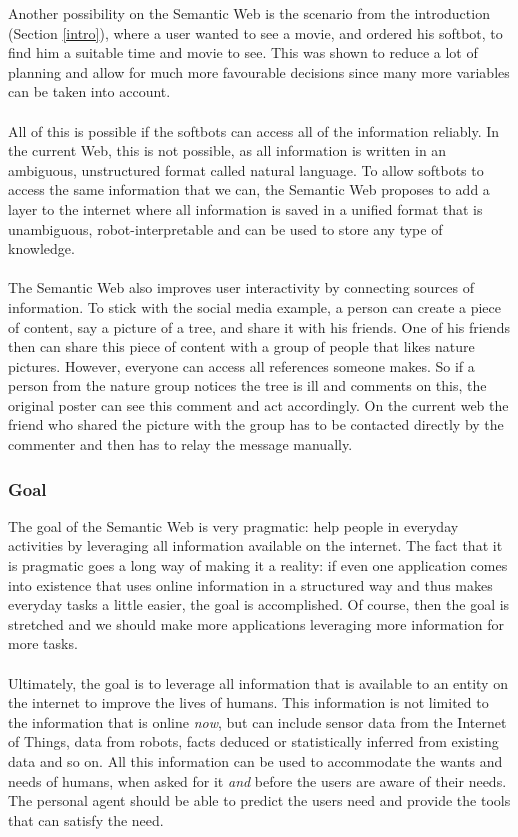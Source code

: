 \documentclass{article}
\begin{document}
 Another possibility on the Semantic Web is the scenario from the introduction (Section \ref{intro}), where a user wanted to see a movie, and ordered his softbot, to find him a suitable time and movie to see. This was shown to reduce a lot of planning and allow for much more favourable decisions since many more variables can be taken into account.
 \paragraph{}
 All of this is possible if the softbots can access all of the information reliably. In the current Web, this is not possible, as all information is written in an ambiguous, unstructured format called natural language. To allow softbots to access the same information that we can, the Semantic Web proposes to add a layer to the internet where all information is saved in a unified format that is unambiguous, robot-interpretable and can be used to store any type of knowledge.
 \paragraph{}
  The Semantic Web also improves user interactivity by connecting sources of information. To stick with the social media example, a person can create a piece of content, say a picture of a tree, and share it with his friends. One of his friends then can share this piece of content with a group of people that likes nature pictures. However, everyone can access all references someone makes. So if a person from the nature group notices the tree is ill and comments on this, the original poster can see this comment and act accordingly. On the current web the friend who shared the picture with the group has to be contacted directly by the commenter and then has to relay the message manually.
 
 \subsubsection{Goal}
 The goal of the Semantic Web is very pragmatic: help people in everyday activities by leveraging all information available on the internet. The fact that it is pragmatic goes a long way of making it a reality: if even one application comes into existence that uses online information in a structured way and thus makes everyday tasks a little easier, the goal is accomplished. Of course, then the goal is stretched and we should make more applications leveraging more information for more tasks.
 \paragraph{}
 Ultimately, the goal is to leverage all information that is available to an entity on the internet to improve the lives of humans. This information is not limited to the information that is online \emph{now}, but can include sensor data from the Internet of Things, data from robots, facts deduced or statistically inferred from existing data and so on. All this information can be used to accommodate the wants and needs of humans, when asked for it \textit{and} before the users are aware of their needs. The personal agent should be able to predict the users need and provide the tools that can satisfy the need.
\end{document}
